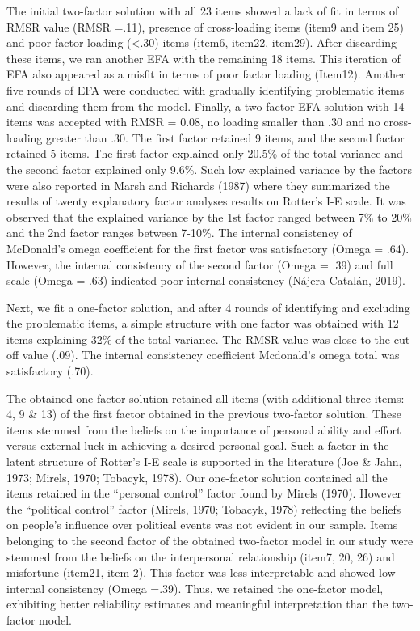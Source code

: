 \documentclass[
  man]{apa6}
\begin{document}
The initial two-factor solution with all 23 items showed a lack of fit in terms of RMSR value (RMSR =.11), presence of cross-loading items (item9 and item 25) and poor factor loading (\textless.30) items (item6, item22, item29). After discarding these items, we ran another EFA with the remaining 18 items. This iteration of EFA also appeared as a misfit in terms of poor factor loading (Item12). Another five rounds of EFA were conducted with gradually identifying problematic items and discarding them from the model. Finally, a two-factor EFA solution with 14 items was accepted with RMSR = 0.08, no loading smaller than .30 and no cross-loading greater than .30. The first factor retained 9 items, and the second factor retained 5 items. The first factor explained only 20.5\% of the total variance and the second factor explained only 9.6\%. Such low explained variance by the factors were also reported in Marsh and Richards (1987) where they summarized the results of twenty explanatory factor analyses results on Rotter's I-E scale. It was observed that the explained variance by the 1st factor ranged between 7\% to 20\% and the 2nd factor ranges between 7-10\%. The internal consistency of McDonald's omega coefficient for the first factor was satisfactory (Omega = .64). However, the internal consistency of the second factor (Omega = .39) and full scale (Omega = .63) indicated poor internal consistency (Nájera Catalán, 2019).

Next, we fit a one-factor solution, and after 4 rounds of identifying and excluding the problematic items, a simple structure with one factor was obtained with 12 items explaining 32\% of the total variance. The RMSR value was close to the cut-off value (.09). The internal consistency coefficient Mcdonald's omega total was satisfactory (.70).

The obtained one-factor solution retained all items (with additional three items: 4, 9 \& 13) of the first factor obtained in the previous two-factor solution. These items stemmed from the beliefs on the importance of personal ability and effort versus external luck in achieving a desired personal goal. Such a factor in the latent structure of Rotter's I-E scale is supported in the literature (Joe \& Jahn, 1973; Mirels, 1970; Tobacyk, 1978). Our one-factor solution contained all the items retained in the ``personal control'' factor found by Mirels (1970). However the ``political control'' factor (Mirels, 1970; Tobacyk, 1978) reflecting the beliefs on people's influence over political events was not evident in our sample. Items belonging to the second factor of the obtained two-factor model in our study were stemmed from the beliefs on the interpersonal relationship (item7, 20, 26) and misfortune (item21, item 2). This factor was less interpretable and showed low internal consistency (Omega =.39). Thus, we retained the one-factor model, exhibiting better reliability estimates and meaningful interpretation than the two-factor model.
\end{document}
